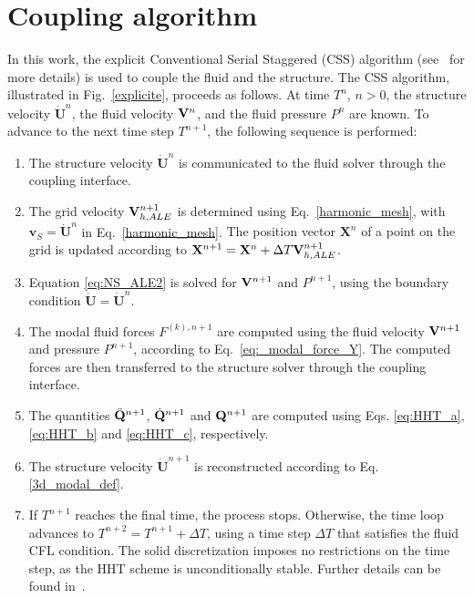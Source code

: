 \section{Coupling algorithm}\label{sec:CSS}

In this work, the explicit Conventional Serial Staggered (CSS) algorithm (see~\cite{CSS} for more details) is used to couple the fluid and the structure. The CSS algorithm, illustrated in Fig.~\ref{explicite}, proceeds as follows. At time \(T^n\), $n>0$, the structure velocity \(\dot{\mathbf{U}}^{n}\), the fluid velocity \(\mathbf{V}^{n}\), and the fluid pressure \(P^{n}\) are known. To advance to the next time step \(T^{n+1}\), the following sequence is performed:
\begin{enumerate}
    \item The structure velocity $\dot{\mathbf{U}}^{n}$ is communicated to the fluid solver through the coupling interface. 
    \item The grid velocity $\mathbf{V}^{n+1}_{h,ALE}$ is determined using Eq.~\eqref{harmonic_mesh}, with $\mathbf{v}_{S} = \dot{\mathbf{U}}^{n}$ in Eq.~\eqref{harmonic_mesh}. {The position vector ${\mathbf{X}}^n$ of a point on the grid is updated according to
 ${\mathbf{X}}^{n+1} = {\mathbf{X}}^{n} + \Delta T \mathbf{V}^{n+1}_{h,ALE}$.}
    \item Equation \eqref{eq:NS_ALE2} is solved for \(\mathbf{V}^{n+1}\) and \(P^{n+1}\), using the boundary condition \(\dot{\mathbf{U}} = \dot{\mathbf{U}}^{n}\).  
    \item The modal fluid forces $F^{(k), n+1}$ are computed using the fluid velocity $\mathbf{V}^{n+1}$ and pressure $P^{n+1}$, according to Eq.~\eqref{eq:_modal_force_Y}. The computed forces are then transferred to the structure solver through the coupling interface.
    \item The quantities \(\ddot{\mathbf{Q}}^{n+1}\), \(\dot{\mathbf{Q}}^{n+1}\) and \({\mathbf{Q}}^{n+1}\) are computed using Eqs. \eqref{eq:HHT_a}, \eqref{eq:HHT_b} and \eqref{eq:HHT_c}, respectively.
    \item The structure velocity $\dot{\mathbf{U}}^{n+1}$ is reconstructed according to Eq. \eqref{3d_modal_def}.
    \item If \(T^{n+1}\) reaches the final time, the process stops. Otherwise, the time loop advances to \(T^{n+2} = T^{n+1} + \Delta T\), using a time step \(\Delta T\) that satisfies the fluid CFL condition. The solid discretization imposes no restrictions on the time step, as the HHT scheme is unconditionally stable.  Further details can be found in~\cite{lagrange2025fluid}.
\end{enumerate}


